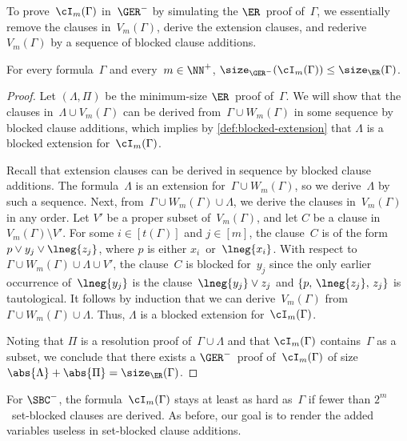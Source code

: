 \documentclass[12pt]{article}
\begin{document}
To prove~$\cI_m(\Gamma)$ in~$\GER^-$ by simulating the $\ER$~proof of~$\Gamma$,
we essentially remove the clauses in~$V_m(\Gamma)$,
derive the extension clauses, and rederive~$V_m(\Gamma)$
by a sequence of blocked clause additions.

\begin{lemma}\label{thm:guarding-blocked-pair-easy-for-GER}
  For every formula~$\Gamma$ and every~$m \in \NN^+$,
  $\size_{\GER^-}(\cI_m(\Gamma)) \leq \size_{\ER}(\Gamma)$.
\end{lemma}
\begin{proof}
  Let $(\Lambda, \Pi)$ be the minimum-size $\ER$~proof of~$\Gamma$.
  We will show that the clauses in~$\Lambda \cup V_m(\Gamma)$
  can be derived from~$\Gamma \cup W_m(\Gamma)$
  in some sequence by blocked clause additions,
  which implies by \cref{def:blocked-extension}
  that $\Lambda$ is a blocked extension for~$\cI_m(\Gamma)$.

  Recall that extension clauses can be derived in sequence
  by blocked clause additions.
  The formula~$\Lambda$ is an extension for~$\Gamma \cup W_m(\Gamma)$,
  so we derive~$\Lambda$ by such a sequence.
  Next, from~$\Gamma \cup W_m(\Gamma) \cup \Lambda$,
  we derive the clauses in~$V_m(\Gamma)$ in any order.
  Let $V'$ be a proper subset of~$V_m(\Gamma)$,
  and let $C$ be a clause in~$V_m(\Gamma) \setminus V'$.
  For some $i \in [t(\Gamma)]$ and $j \in [m]$,
  the clause~$C$ is of the form~$p \lor y_j \lor \lneg{z_j}$,
  where $p$ is either $x_i$~or~$\lneg{x_i}$.
  With respect to~$\Gamma \cup W_m(\Gamma) \cup \Lambda \cup V'$,
  the clause~$C$ is blocked for~$y_j$
  since the only earlier occurrence of~$\lneg{y_j}$
  is the clause~$\lneg{y_j} \lor z_j$
  and $\{p,\, \lneg{z_j},\, z_j\}$ is tautological.
  It follows by induction that we can derive~$V_m(\Gamma)$
  from~$\Gamma \cup W_m(\Gamma) \cup \Lambda$.
  Thus, $\Lambda$ is a blocked extension for~$\cI_m(\Gamma)$.

  Noting that $\Pi$ is a resolution proof of~$\Gamma \cup \Lambda$
  and that $\cI_m(\Gamma)$ contains~$\Gamma$ as a subset,
  we conclude that there exists a $\GER^-$~proof of~$\cI_m(\Gamma)$
  of size~$\abs{\Lambda} + \abs{\Pi} = \size_\ER(\Gamma)$.
\end{proof}

For $\SBC^-$, the formula~$\cI_m(\Gamma)$
stays at least as hard as~$\Gamma$
if fewer than $2^m$~set-blocked clauses are derived.
As before, our goal is to render the added variables
useless in set-blocked clause additions.
\end{document}
